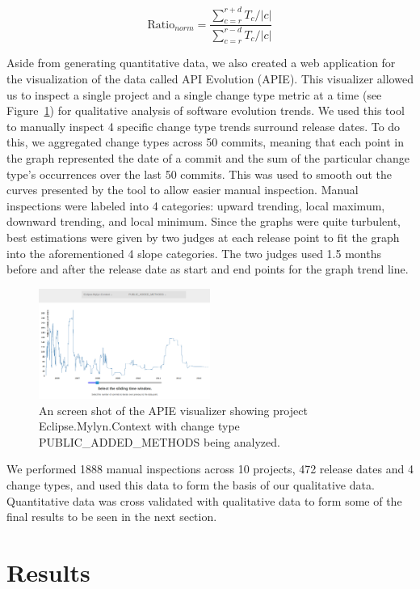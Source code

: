 \documentclass[conference]{IEEEtran}
\begin{document}
\begin{equation}
\text{Ratio}_{norm} = \frac{ \sum_{c=r}^{r+d} T_c / |c|} { \sum_{c=r}^{r-d} T_c / |c|}
\label{eq:norm}
\end{equation}

Aside from generating quantitative data, we also created a web application for the visualization of the data called API Evolution (APIE). This visualizer allowed
us to inspect a single project and a single change type metric at a time (see Figure~\ref{fig:apie}) for qualitative analysis of software evolution trends. We
used this tool to manually inspect 4 specific change type trends surround release dates. To do this, we aggregated change types across 50 commits, meaning that
each point in the graph represented the date of a commit and the sum of the particular change type's occurrences over the last 50 commits. This was used to smooth
out the curves presented by the tool to allow easier manual inspection. Manual inspections were labeled into 4 categories: upward trending, local maximum, downward
trending, and local minimum. Since the graphs were quite turbulent, best estimations were given by two judges at each release point to fit the graph into the aforementioned
4 slope categories. The two judges used 1.5 months before and after the release date as start and end points for the graph trend line.

\begin{figure}[tb!]
\centering
\includegraphics[width=0.5\textwidth]{images/apie.png}
\caption{An screen shot of the APIE visualizer showing project Eclipse.Mylyn.Context with change type PUBLIC\_ADDED\_METHODS being analyzed.\label{fig:apie}}
\end{figure}

We performed 1888 manual inspections across 10 projects, 472 release dates and 4 change types, and used this data to form the basis of our qualitative data.
Quantitative data was cross validated with qualitative data to form some of the final results to be seen in the next section. 

\section{Results}
\label{sec:results}
\end{document}
